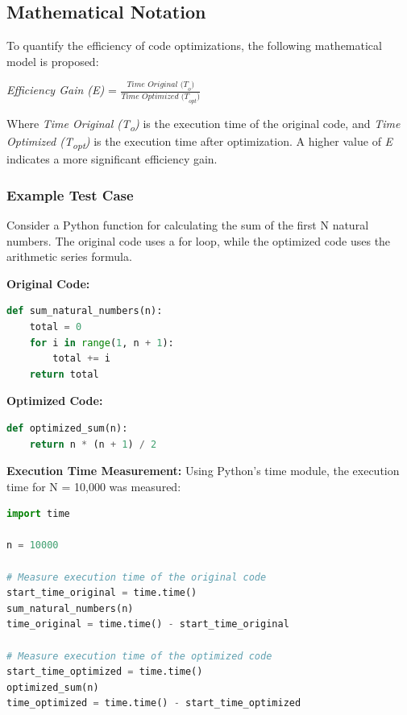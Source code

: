 \documentclass[conference,compsoc]{IEEEtran}
\begin{document}
\subsection{Mathematical Notation}
To quantify the efficiency of code optimizations, the following mathematical model is proposed:

\textit{Efficiency Gain (E)} = \(\frac{\textit{Time Original (T}_{o}\textit{)}}{\textit{Time Optimized (T}_{opt}\textit{)}}\)

Where \textit{Time Original (T\textsubscript{o})} is the execution time of the original code, and \textit{Time Optimized (T\textsubscript{opt})} is the execution time after optimization. A higher value of \textit{E} indicates a more significant efficiency gain.

\subsubsection{Example Test Case}
Consider a Python function for calculating the sum of the first N natural numbers. The original code uses a for loop, while the optimized code uses the arithmetic series formula.

\textbf{Original Code:}
\begin{lstlisting}[language=Python, backgroundcolor=\color{lightgray}]
def sum_natural_numbers(n):
    total = 0
    for i in range(1, n + 1):
        total += i
    return total
\end{lstlisting}

\textbf{Optimized Code:}
\begin{lstlisting}[language=Python, backgroundcolor=\color{lightgray}]
def optimized_sum(n):
    return n * (n + 1) / 2
\end{lstlisting}

\textbf{Execution Time Measurement:}
Using Python's time module, the execution time for N = 10,000 was measured:
\begin{lstlisting}[language=Python, backgroundcolor=\color{lightgray}]
import time

n = 10000

# Measure execution time of the original code
start_time_original = time.time()
sum_natural_numbers(n)
time_original = time.time() - start_time_original

# Measure execution time of the optimized code
start_time_optimized = time.time()
optimized_sum(n)
time_optimized = time.time() - start_time_optimized
\end{lstlisting}
\end{document}
